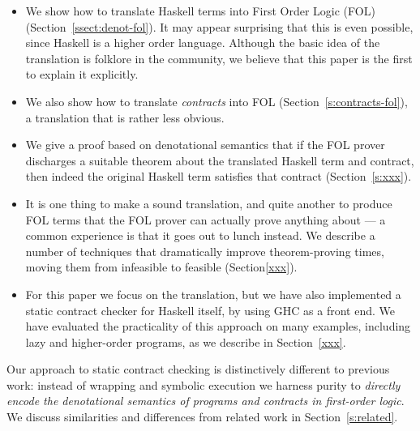 \begin{itemize}
\item We show how to translate Haskell terms
into First Order Logic (FOL) (Section~\ref{ssect:denot-fol}).  
It may appear surprising that this 
is even possible, since Haskell is a higher order language.  Although
the basic idea of the translation is folklore in the community,
we believe that this paper is the first to explain it explicitly.

\item We also show how to translate \emph{contracts} into FOL
      (Section~\ref{s:contracts-fol}), 
      a translation that is rather less obvious.

\item We give a proof based on denotational semantics 
that if the FOL prover discharges a 
suitable theorem about the translated Haskell term and contract, 
then indeed the original Haskell term satisfies that contract (Section~\ref{s:xxx}).

\item It is one thing to make a sound translation, and quite another
to produce FOL terms that the FOL prover can actually prove anything
about --- a common experience is that it goes out to lunch instead.  We
describe a number of techniques that dramatically improve
theorem-proving times, moving them from infeasible to feasible (Section\ref{xxx}).

\item For this paper we focus on the
translation, but we have also implemented a static contract checker
for Haskell itself, by using GHC as a front end.  We have evaluated
the practicality of this approach on many examples, including lazy and
higher-order programs, as we describe in Section~\ref{xxx}.  
\end{itemize}
Our approach to static contract checking is distinctively different to
previous work: instead of wrapping and symbolic execution we harness
purity to \emph{directly encode the denotational semantics of programs
and contracts in first-order logic}.  We discuss similarities and differences from
related work in Section~\ref{s:related}.


















